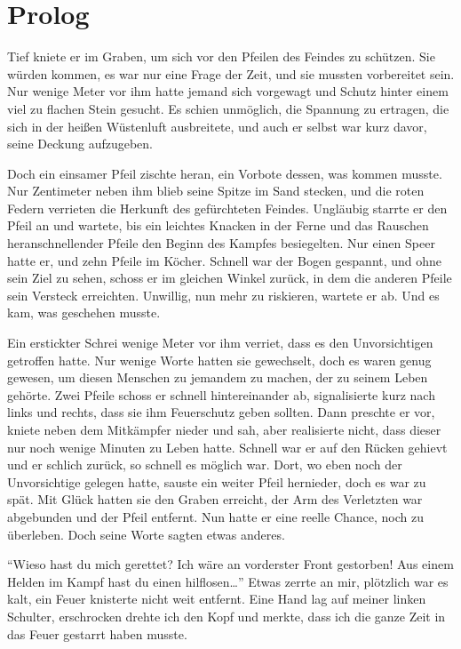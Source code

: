 \chapter{Prolog}
\label{cha:prolog}
Tief kniete er im Graben, um sich vor den Pfeilen des Feindes zu schützen. Sie würden kommen, es war nur eine Frage der Zeit, und sie mussten vorbereitet sein. Nur wenige Meter vor ihm hatte jemand sich vorgewagt und Schutz hinter einem viel zu flachen Stein gesucht. Es schien unmöglich, die Spannung zu ertragen, die sich in der heißen Wüstenluft ausbreitete, und auch er selbst war kurz davor, seine Deckung aufzugeben.

Doch ein einsamer Pfeil zischte heran, ein Vorbote dessen, was kommen musste. Nur Zentimeter neben ihm blieb seine Spitze im Sand stecken, und die roten Federn verrieten die Herkunft des gefürchteten Feindes. Ungläubig starrte er den Pfeil an und wartete, bis ein leichtes Knacken in der Ferne und das Rauschen heranschnellender Pfeile den Beginn des Kampfes besiegelten.
Nur einen Speer hatte er, und zehn Pfeile im Köcher. Schnell war der Bogen gespannt, und ohne sein Ziel zu sehen, schoss er im gleichen Winkel zurück, in dem die anderen Pfeile sein Versteck erreichten. 
Unwillig, nun mehr zu riskieren, wartete er ab. Und es kam, was geschehen musste.

Ein erstickter Schrei wenige Meter vor ihm verriet, dass es den Unvorsichtigen getroffen hatte. Nur wenige Worte hatten sie gewechselt, doch es waren genug gewesen, um diesen Menschen zu jemandem zu machen, der zu seinem Leben gehörte. 
Zwei Pfeile schoss er schnell hintereinander ab, signalisierte kurz nach links und rechts, dass sie ihm Feuerschutz geben sollten. Dann preschte er vor, kniete neben dem Mitkämpfer nieder und sah, aber realisierte nicht, dass dieser nur noch wenige Minuten zu Leben hatte. Schnell war er auf den Rücken gehievt und er schlich zurück, so schnell es möglich war. Dort, wo eben noch der Unvorsichtige gelegen hatte, sauste ein weiter Pfeil hernieder, doch es war zu spät. Mit Glück hatten sie den Graben erreicht, der Arm des Verletzten war abgebunden und der Pfeil entfernt. Nun hatte er eine reelle Chance, noch zu überleben. 
Doch seine Worte sagten etwas anderes.

\enquote{Wieso hast du mich gerettet? Ich wäre an vorderster Front gestorben! Aus einem Helden im Kampf hast du einen hilflosen\dots{}}
Etwas zerrte an mir, plötzlich war es kalt, ein Feuer knisterte nicht weit entfernt. Eine Hand lag auf meiner linken Schulter, erschrocken drehte ich den Kopf und merkte, dass ich die ganze Zeit in das Feuer gestarrt haben musste.

